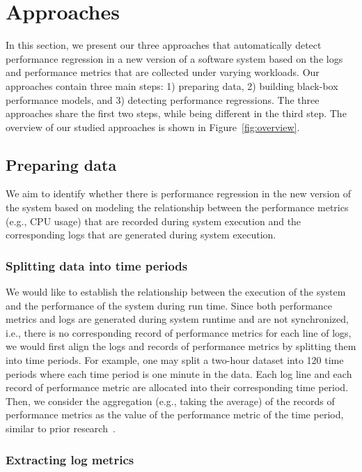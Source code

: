 \section{Approaches} \label{sec:approach}


In this section, we present our three approaches that automatically detect performance regression in a new version of a software system based on the logs and performance metrics that are collected under varying workloads. Our approaches contain three main steps: 1) preparing data, 2) building black-box performance models, and 3) detecting performance regressions. The three approaches share the first two steps, while being different in the third step. The overview of our studied approaches is shown in Figure~\ref{fig:overview}.

\subsection{Preparing data}
We aim to identify whether there is performance regression in the new version of the system based on modeling the relationship between the performance metrics (e.g., CPU usage) that are recorded during system execution and the corresponding logs that are generated during system execution.

\subsubsection{Splitting data into time periods}
We would like to establish the relationship between the execution of the system and the performance of the system during run time. Since both performance metrics and logs are generated during system runtime and are not synchronized, i.e., there is no corresponding record of performance metrics for each line of logs, we would first align the logs and records of performance metrics by splitting them into time periods. For example, one may split a  two-hour dataset into 120 time periods where each time period is one minute in the data. Each log line and each record of performance metric are allocated into their corresponding time period. Then, we consider the aggregation (e.g., taking the average) of the records of performance metrics as the value of the performance metric of the time period, similar to prior research~\citep{Foo:2010:MPR:1848650.1849222}. 

\subsubsection{Extracting log metrics}

